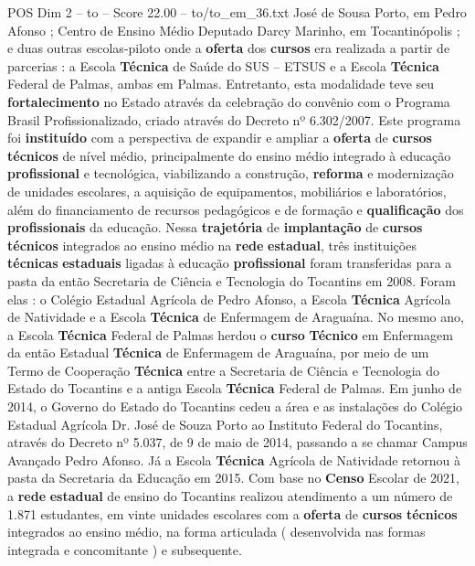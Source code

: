 \begin{textsample}{POS Dim 2 – to – Score 22.00 – to/to\_em\_36.txt}
José de Sousa Porto, em Pedro Afonso ; Centro de Ensino Médio Deputado Darcy Marinho, em Tocantinópolis ; e duas outras escolas-piloto onde a \textbf{oferta} dos \textbf{cursos} era realizada a partir de parcerias : a Escola \textbf{Técnica} de Saúde do SUS – ETSUS e a Escola \textbf{Técnica} Federal de Palmas, ambas em Palmas.
Entretanto, esta modalidade teve seu \textbf{fortalecimento} no Estado através da celebração do convênio com o Programa Brasil Profissionalizado, criado através do Decreto nº 6.302/2007.
Este programa foi \textbf{instituído} com a perspectiva de expandir e ampliar a \textbf{oferta} de \textbf{cursos} \textbf{técnicos} de nível médio, principalmente do ensino médio integrado à educação \textbf{profissional} e tecnológica, viabilizando a construção, \textbf{reforma} e modernização de unidades escolares, a aquisição de equipamentos, mobiliários e laboratórios, além do financiamento de recursos pedagógicos e de formação e \textbf{qualificação} dos \textbf{profissionais} da educação.
Nessa \textbf{trajetória} de \textbf{implantação} de \textbf{cursos} \textbf{técnicos} integrados ao ensino médio na \textbf{rede} \textbf{estadual}, três instituições \textbf{técnicas} \textbf{estaduais} ligadas à educação \textbf{profissional} foram transferidas para a pasta da então Secretaria de Ciência e Tecnologia do Tocantins em 2008.
Foram elas : o Colégio Estadual Agrícola de Pedro Afonso, a Escola \textbf{Técnica} Agrícola de Natividade e a Escola \textbf{Técnica} de Enfermagem de Araguaína.
No mesmo ano, a Escola \textbf{Técnica} Federal de Palmas herdou o \textbf{curso} \textbf{Técnico} em Enfermagem da então Estadual \textbf{Técnica} de Enfermagem de Araguaína, por meio de um Termo de Cooperação \textbf{Técnica} entre a Secretaria de Ciência e Tecnologia do Estado do Tocantins e a antiga Escola \textbf{Técnica} Federal de Palmas.
Em junho de 2014, o Governo do Estado do Tocantins cedeu a área e as instalações do Colégio Estadual Agrícola Dr.
José de Souza Porto ao Instituto Federal do Tocantins, através do Decreto nº 5.037, de 9 de maio de 2014, passando a se chamar Campus Avançado Pedro Afonso.
Já a Escola \textbf{Técnica} Agrícola de Natividade retornou à pasta da Secretaria da Educação em 2015.
Com base no \textbf{Censo} Escolar de 2021, a \textbf{rede} \textbf{estadual} de ensino do Tocantins realizou atendimento a um número de 1.871 estudantes, em vinte unidades escolares com a \textbf{oferta} de \textbf{cursos} \textbf{técnicos} integrados ao ensino médio, na forma articulada ( desenvolvida nas formas integrada e concomitante ) e subsequente.

\end{textsample}
